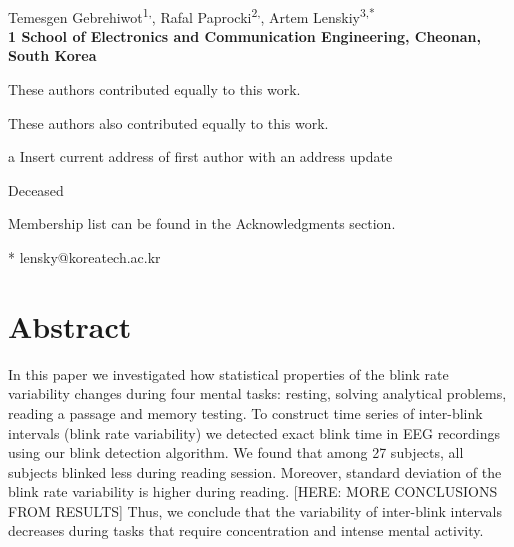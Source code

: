 \documentclass[10pt,letterpaper]{article}
\date{}
\begin{document}
\vspace*{0.35in}

\begin{flushleft}
{\Large
\textbf{}
}
\newline
\\
Temesgen Gebrehiwot\textsuperscript{1,\Yinyang},
Rafal Paprocki\textsuperscript{2,\Yinyang},
Artem Lenskiy\textsuperscript{3,*}{\textpilcrow}
\\
\bigskip
\bf{1} School of Electronics and Communication Engineering, Cheonan, South Korea
\\
\bigskip

% 
%
\Yinyang These authors contributed equally to this work.

\ddag These authors also contributed equally to this work.

\textcurrency a Insert current address of first author with an address update

\dag Deceased

\textpilcrow Membership list can be found in the Acknowledgments section.

* lensky@koreatech.ac.kr

\end{flushleft}
\section*{Abstract}
In this paper we investigated how statistical properties of the blink rate variability changes during four mental tasks: resting, solving analytical problems, reading a passage and memory testing. To construct time series of inter-blink intervals (blink rate variability) we detected exact blink time in EEG recordings using our blink detection algorithm. We found that among 27 subjects, all subjects blinked less during reading session. Moreover, standard deviation of the blink rate variability is higher during reading. [HERE: MORE CONCLUSIONS FROM RESULTS] Thus, we conclude that the variability of inter-blink intervals decreases during tasks that require concentration and intense mental activity.
\end{document}
